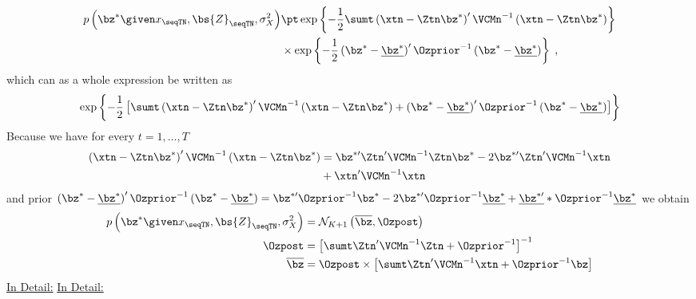 \begin{align*}
p\left(\bz^*\given x_\seqTN,\bs{Z}_\seqTN,\sigma_X^2\right) 
& \pt
\exp \left\lbrace-\frac{1}{2}\sumt\left(\xtn-\Ztn\bz^*\right)^{\prime}\VCMn^{-1}\left(\xtn-\Ztn\bz^*\right)\right\rbrace\\
& \times 
\exp\left\lbrace-\frac{1}{2}\left(\bz^*-\underline{\bz^*}\right)^{\prime}\Ozprior^{-1}\left(\bz^*-\underline{\bz^*}\right)\right\rbrace\;,
\end{align*}
which can as a whole expression be written as
\begin{align*}
\exp \left\lbrace
-\frac{1}{2}
\left[
\sumt
\left(
\xtn-\Ztn\bz^*\right)^{\prime}\VCMn^{-1}\left(\xtn-\Ztn\bz^*
\right)
+
\left(
\bz^*-\underline{\bz^*}\right)^{\prime}\Ozprior^{-1}\left(\bz^*-\underline{\bz^*}
\right)
\right]
\right\rbrace
\end{align*}
Because we have for every $t=1,\ldots,T$
\begin{align*}
\left(
\xtn-\Ztn\bz^*\right)^{\prime}\VCMn^{-1}\left(
\xtn-\Ztn\bz^*\right)
& =
\bz^{*\prime}\Ztn^{\prime}\VCMn^{-1}\Ztn\bz^{*}-2\bz^{*\prime}\Ztn^{\prime}\VCMn^{-1}\xtn\\
& + \xtn^{\prime}\VCMn^{-1}\xtn
\end{align*}
and prior
$
\left(\bz^*-\underline{\bz^*}\right)^{\prime}\Ozprior^{-1}\left(\bz^*-\underline{\bz^*}\right) 
= 
\bz^{*\prime}\Ozprior^{-1}\bz^*
-2\bz^{*\prime}\Ozprior^{-1}\underline{\bz^*} +
\underline{\bz^{*\prime}}*\Ozprior^{-1}\underline{\bz^*}
$
we obtain
\begin{align*}
p\left(\bz^*\given x_\seqTN,\bs{Z}_\seqTN,\sigma_X^2\right) 
&=
\mathcal{N}_{K+1}\left(\overline{\bz},\Ozpost\right)\;\\
\Ozpost
& =
\left[\sumt\Ztn^{\prime}\VCMn^{-1}\Ztn+\Ozprior^{-1}\right]^{-1} \\
\overline{\bz}
& =
\Ozpost\times\left[\sumt\Ztn^{\prime}\VCMn^{-1}\xtn+\Ozprior^{-1}\bz\right]
\end{align*}
%
%
%
%
%
\clearpage
\underline{In Detail:}
%
%
%
%
%
\clearpage
\underline{In Detail:}